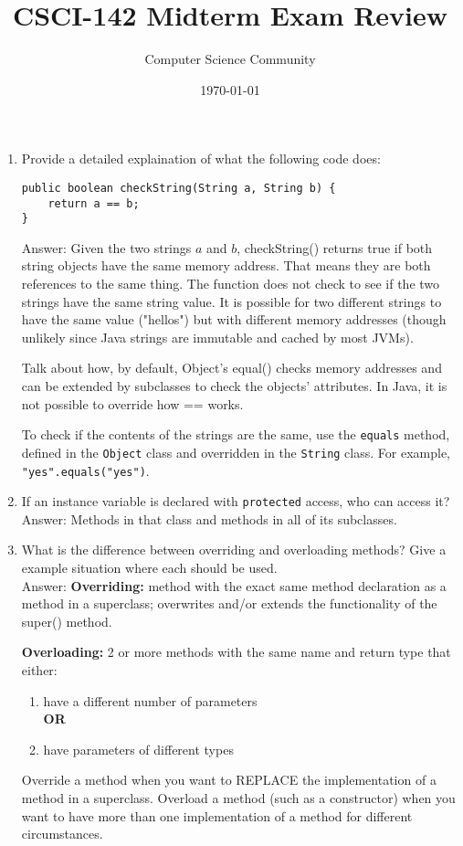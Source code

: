 \documentclass[11pt]{article}
\title{CSCI-142 Midterm Exam Review}
\author{Computer Science Community}
\date{\today}
\newenvironment{answer}{\large\lstset{basicstyle=\large\ttfamily}\color{white} \small{Answer:}\large}{}
\newenvironment{answer}{\large\lstset{basicstyle=\large\ttfamily}\color{red} \small{Answer:}\large}{}
\begin{document}
\header
\begin{enumerate}



\item Provide a detailed explaination of what the following code does:
\begin{lstlisting}
public boolean checkString(String a, String b) {
	return a == b;
}
\end{lstlisting}
\begin{answer}
Given the two strings $a$ and $b$, checkString() returns true if both string objects have the same memory address.  That means they are both references to the same thing.  The function does not check to see if the two strings have the same string value.  It is possible for two different strings to have the same value ("hellos") but with different memory addresses (though unlikely since Java strings are immutable and cached by most JVMs).  

Talk about how, by default, Object's equal() checks memory addresses and can be extended by subclasses to check the objects' attributes.  In Java, it is not possible to override how == works.

To check if the contents of the strings are the same, use the {\tt equals} method, defined in the {\tt Object} class and overridden in the {\tt String} class.
For example, {\tt "yes".equals("yes")}.
\end{answer}



\item If an instance variable is declared with {\tt protected} access, who can access it? \\
\begin{answer}
Methods in that class and methods in all of its subclasses.
\end{answer}



\item What is the difference between overriding and overloading methods?  Give a example situation where each should be used. \\
\begin{answer}
\textbf{Overriding:} method with the exact same method declaration as a method in a superclass; overwrites and/or extends the functionality of the super() method.

\textbf{Overloading:} 2 or more methods with the same name and return type that either:
	\begin{enumerate}
	\item have a different number of parameters\\ \textbf{OR}
	\item have parameters of different types
	\end{enumerate}
Override a method when you want to REPLACE the implementation of a method in a superclass.  Overload a method (such as a constructor) when you want to have more than one implementation of a method for different circumstances.
\end{answer}




\end{enumerate}
\end{document}
